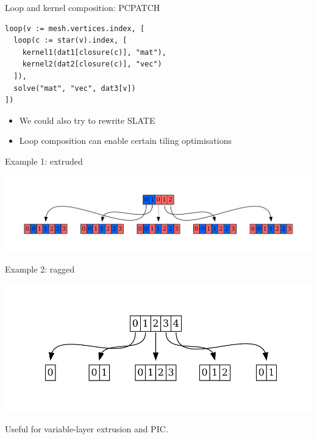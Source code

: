 \documentclass[aspectratio=169]{beamer}
\begin{document}
\begin{frame}[fragile]{Loop and kernel composition: PCPATCH}
  \begin{tcolorbox}
    \begin{verbatim}
loop(v := mesh.vertices.index, [
  loop(c := star(v).index, [
    kernel1(dat1[closure(c)], "mat"),
    kernel2(dat2[closure(c)], "vec")
  ]),
  solve("mat", "vec", dat3[v])
])
    \end{verbatim}
  \end{tcolorbox}

  \vspace{-1em}

  \begin{itemize}
    \item We could also try to rewrite SLATE
    \item Loop composition can enable certain tiling optimisations
  \end{itemize}
\end{frame}


\begin{frame}{Example 1: extruded}
  \noindent
  \begin{minipage}{.2\textwidth}
    \begin{tikzpicture}[scale=.6]
      
    \end{tikzpicture}
  \end{minipage}%
  \begin{minipage}{.8\textwidth}
    \includegraphics[width=\textwidth]{scripts/extruded_layout.gv.pdf}
  \end{minipage}
\end{frame}

\begin{frame}{Example 2: ragged}
  \begin{center}
    \includegraphics[width=\textwidth]{scripts/ragged_layout.gv.pdf}
  \end{center}

  \vspace{-2em}

  Useful for variable-layer extrusion and PIC.
\end{frame}
\end{document}
